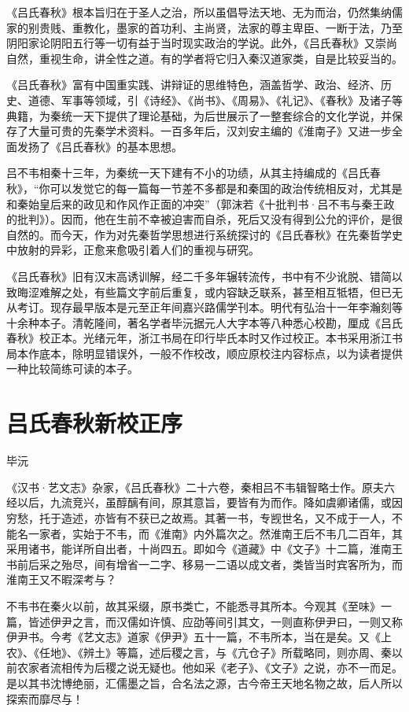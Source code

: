 \documentclass[12pt,UTF8]{ctexbook}
\begin{document}
《吕氏春秋》根本旨归在于圣人之治，所以虽倡导法天地、无为而治，仍然集纳儒家的别贵贱、重教化，墨家的首功利、主尚贤，法家的尊主卑臣、一断于法，乃至阴阳家论阴阳五行等一切有益于当时现实政治的学说。此外，《吕氏春秋》又崇尚自然，重视生命，讲全性之道。有的学者将它归入秦汉道家类，自是比较妥当的。

《吕氏春秋》富有中国重实践、讲辩证的思维特色，涵盖哲学、政治、经济、历史、道德、军事等领域，引《诗经》、《尚书》、《周易》、《礼记》、《春秋》及诸子等典籍，为秦统一天下提供了理论基础，为后世展示了一整套综合的文化学说，并保存了大量可贵的先秦学术资料。一百多年后，汉刘安主编的《淮南子》又进一步全面发扬了《吕氏春秋》的基本思想。

吕不韦相秦十三年，为秦统一天下建有不小的功绩，从其主持编成的《吕氏春秋》，“你可以发觉它的每一篇每一节差不多都是和秦国的政治传统相反对，尤其是和秦始皇后来的政见和作风作正面的冲突”（郭沫若《十批判书·吕不韦与秦王政的批判》）。因而，他在生前不幸被迫害而自杀，死后又没有得到公允的评价，是很自然的。而今天，作为对先秦哲学思想进行系统探讨的《吕氏春秋》在先秦哲学史中放射的异彩，正愈来愈吸引着人们的重视与研究。

《吕氏春秋》旧有汉末高诱训解，经二千多年辗转流传，书中有不少讹脱、错简以致晦涩难解之处，有些篇文字前后重复，或内容缺乏联系，甚至相互牴牾，但已无从考订。现存最早版本是元至正年间嘉兴路儒学刊本。明代有弘治十一年李瀚刻等十余种本子。清乾隆间，著名学者毕沅据元人大字本等八种悉心校勘，厘成《吕氏春秋》校正本。光绪元年，浙江书局在印行毕氏本时又作过校正。本书采用浙江书局本作底本，除明显错误外，一般不作校改，顺应原校注内容标点，以为读者提供一种比较简练可读的本子。

\chapter{吕氏春秋新校正序}


毕沅

《汉书·艺文志》杂家，《吕氏春秋》二十六卷，秦相吕不韦辑智略士作。原夫六经以后，九流竞兴，虽醇醨有间，原其意旨，要皆有为而作。降如虞卿诸儒，或因穷愁，托于造述，亦皆有不获已之故焉。其著一书，专觊世名，又不成于一人，不能名一家者，实始于不韦，而《淮南》内外篇次之。然淮南王后不韦几二百年，其采用诸书，能详所自出者，十尚四五。即如今《道藏》中《文子》十二篇，淮南王书前后采之殆尽，间有增省一二字、移易一二语以成文者，类皆当时宾客所为，而淮南王又不暇深考与？

不韦书在秦火以前，故其采缀，原书类亡，不能悉寻其所本。今观其《至味》一篇，皆述伊尹之言，而汉儒如许慎、应劭等间引其文，一则直称伊尹曰，一则又称伊尹书。今考《艺文志》道家《伊尹》五十一篇，不韦所本，当在是矣。又《上农》、《任地》、《辨土》等篇，述后稷之言，与《亢仓子》所载略同，则亦周、秦以前农家者流相传为后稷之说无疑也。他如采《老子》、《文子》之说，亦不一而足。是以其书沈博绝丽，汇儒墨之旨，合名法之源，古今帝王天地名物之故，后人所以探索而靡尽与！
\end{document}
